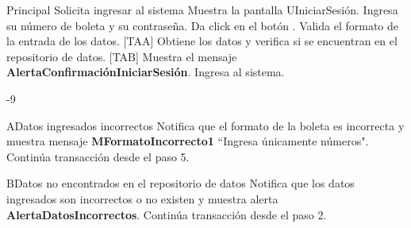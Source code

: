\begin{UCtrayectoria}{Principal}
  \UCpaso[\UCactor] Solicita ingresar al sistema
  \UCpaso Muestra la pantalla UIniciarSesión.
  \UCpaso[\UCactor] Ingresa su número de boleta y su contraseña.
  \UCpaso[\UCactor]Da click en el botón .
  \UCpaso Valida el formato de la entrada de los datos. [TAA]
  \UCpaso Obtiene los datos y verifica si se encuentran en el repositorio de datos. [TAB]
  \UCpaso Muestra el mensaje {\bf AlertaConfirmaciónIniciarSesión}.
  \UCpaso[\UCactor]Ingresa al sistema.
\end{UCtrayectoria}
-9

\begin{UCtrayectoriaA}{A}{Datos ingresados incorrectos}
  \UCpaso Notifica que el formato de la boleta es incorrecta y muestra mensaje {\bf MFormatoIncorrecto1} ``Ingresa únicamente números".
  \UCpaso Continúa transacción desde el paso 5.
\end{UCtrayectoriaA}

\begin{UCtrayectoriaA}{B}{Datos no encontrados en el repositorio de datos}
  \UCpaso Notifica que los datos ingresados son incorrectos o no existen y muestra alerta {\bf AlertaDatosIncorrectos}.
  \UCpaso Continúa transacción desde el paso 2.
\end{UCtrayectoriaA}
